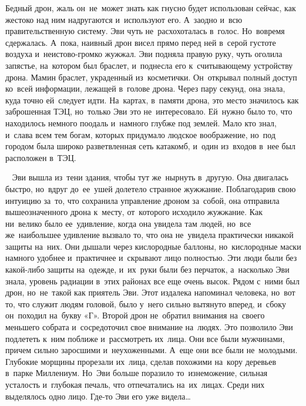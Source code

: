 Бедный дрон, жаль он~не~может знать как гнусно будет использован сейчас, как жестоко над ним надругаются и~используют его.
А~заодно и~всю правительственную систему.
Эви чуть не~расхохоталась в~голос.
Но~вовремя сдержалась.
А~пока, наивный дрон висел прямо перед ней в~серой густоте воздуха и~неистово-громко жужжал.
Эви подняла правую руку, чуть оголила запястье, на~котором был браслет, и~поднесла его к~считывающему устройству дрона.
Мамин браслет, украденный из~косметички.
Он~открывал полный доступ ко~всей информации, лежащей в~голове дрона.
Через пару секунд, она знала, куда точно ей~следует идти.
На~картах, в~памяти дрона, это место значилось как заброшенная ТЭЦ, но~только Эви это не~интересовало.
Ей~нужно было то, что находилось немного поодаль и~намного глубже под землей.
Мало кто знал, и~слава всем тем богам, которых придумало людское воображение, но~под городом была широко разветвленная сеть катакомб, и~один из~входов в~нее был расположен в~ТЭЦ.

~
Эви вышла из~тени здания, чтобы тут же~нырнуть в~другую.
Она двигалась быстро, но~вдруг до~ее~ушей долетело странное жужжание.
Поблагодарив свою интуицию за~то, что сохранила управление дроном за~собой, она отправила вышеозначенного дрона к~месту, от~которого исходило жужжание.
Как ни~велико было ее~удивление, когда она увидела там людей, но~все же~наибольшее удивление вызвало то, что она не~увидела практически никакой защиты на~них.
Они дышали через кислородные баллоны, но~кислородные маски намного удобнее и~практичнее и~скрывают лицо полностью.
Эти люди были без какой-либо защиты на~одежде, и~их~руки были без перчаток, а~насколько Эви знала, уровень радиации в~этих районах все еще очень высок.
Рядом с~ними был дрон, но~не~такой как приятель Эви.
Этот издалека напоминал человека, но~вот то, что служит людям головой, было у~него сильно вытянуто вперед, и~сбоку он~походил на~букву «Г».
Второй дрон не~обратил внимания на~своего меньшего собрата и~сосредоточил свое внимание на~людях.
Это позволило Эви подлететь к~ним поближе и~рассмотреть их~лица.
Они все были мужчинами, причем сильно заросшими и~неухоженными.
А~еще они все были не~молодыми.
Глубокие морщины прорезали их~лица, сделав похожими на~кору деревьев в~парке Миллениум.
Но~Эви больше поразило то~изнеможение, сильная усталость и~глубокая печаль, что отпечатались на~их~лицах.
Среди них выделялось одно лицо.
Где-то Эви его уже видела…
 
